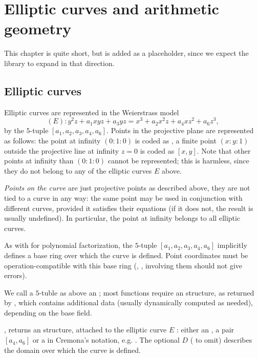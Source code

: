 %
%
\chapter{Elliptic curves and arithmetic geometry}

This chapter is quite short, but is added as a placeholder, since
we expect the library to expand in that direction.

\section{Elliptic curves}
Elliptic curves are represented in the Weierstrass model
$$ (E): y^2z + a_1xyz + a_3 yz = x^3 + a_2 x^2z + a_4 xz^2 + a_6z^3, $$
by the $5$-tuple $[a_1,a_2,a_3,a_4,a_6]$. Points in the projective
plane are represented as follows: the point at infinity $(0:1:0)$ is coded
as \kbd{[0]}, a finite point $(x:y:1)$ outside the projective line at infinity
$z = 0$ is coded as $[x,y]$. Note that other points at infinity than $(0:1:0)$
cannot be represented; this is harmless, since they do not belong to any of
the elliptic curves $E$ above.

\emph{Points on the curve} are just projective points as described above,
they are not tied to a curve in any way: the same point may be used in
conjunction with different curves, provided it satisfies their equations (if
it does not, the result is usually undefined). In particular, the point at
infinity belongs to all elliptic curves.

As with  for polynomial factorization, the $5$-tuple
$[a_1,a_2,a_3,a_4,a_6]$ implicitly defines a base ring over which the curve
is defined. Point coordinates must be operation-compatible with this
base ring (, ,  involving them should not give
errors).


We call a $5$-tuble as above an ; most functions require an
 structure, as returned by , which contains additional
data (usually dynamically computed as needed), depending on the base field.

, returns an  structure,
attached to the elliptic curve $E$ : either an , a pair $[a_4,a_6]$
or a  in Cremona's notation, e.g. . The optional $D$
( to omit) describes the domain over which the curve is defined.

